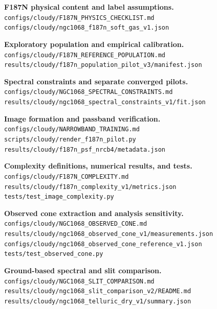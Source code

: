 \documentclass[10pt,letterpaper]{article}
\newcommand{\pathref}[1]{{\small\nolinkurl{#1}}}
\begin{document}
\small
\begin{description}[style=nextline,leftmargin=2.5em,labelwidth=2em,itemsep=8pt]
\item[E1] \textbf{F187N physical content and label assumptions.}\\
\pathref{configs/cloudy/F187N_PHYSICS_CHECKLIST.md}\\
\pathref{configs/cloudy/ngc1068_f187n_soft_gas_v1.json}

\item[E2] \textbf{Exploratory population and empirical calibration.}\\
\pathref{configs/cloudy/F187N_REFERENCE_POPULATION.md}\\
\pathref{results/cloudy/f187n_population_pilot_v3/manifest.json}

\item[E3] \textbf{Spectral constraints and separate converged pilots.}\\
\pathref{configs/cloudy/NGC1068_SPECTRAL_CONSTRAINTS.md}\\
\pathref{results/cloudy/ngc1068_spectral_constraints_v1/fit.json}

\item[E4] \textbf{Image formation and passband verification.}\\
\pathref{configs/cloudy/NARROWBAND_TRAINING.md}\\
\pathref{scripts/cloudy/render_f187n_pilot.py}\\
\pathref{results/cloudy/f187n_psf_nrcb4/metadata.json}

\item[E5] \textbf{Complexity definitions, numerical results, and tests.}\\
\pathref{configs/cloudy/F187N_COMPLEXITY.md}\\
\pathref{results/cloudy/f187n_complexity_v1/metrics.json}\\
\pathref{tests/test_image_complexity.py}

\item[E6] \textbf{Observed cone extraction and analysis sensitivity.}\\
\pathref{configs/cloudy/NGC1068_OBSERVED_CONE.md}\\
\pathref{results/cloudy/ngc1068_observed_cone_v1/measurements.json}\\
\pathref{configs/cloudy/ngc1068_observed_cone_reference_v1.json}\\
\pathref{tests/test_observed_cone.py}

\item[E7] \textbf{Ground-based spectral and slit comparison.}\\
\pathref{configs/cloudy/NGC1068_SLIT_COMPARISON.md}\\
\pathref{results/cloudy/ngc1068_slit_comparison_v2/README.md}\\
\pathref{results/cloudy/ngc1068_telluric_dry_v1/summary.json}


\end{description}
\end{document}
